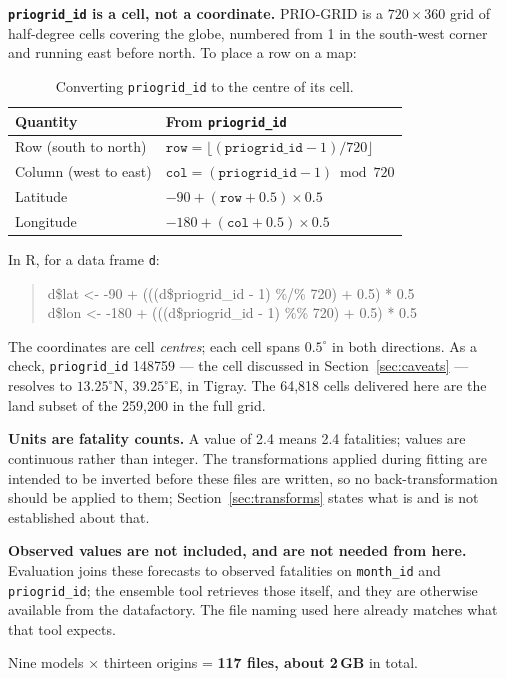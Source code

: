 \textbf{\texttt{priogrid\_id} is a cell, not a coordinate.} PRIO-GRID is a
$720 \times 360$ grid of half-degree cells covering the globe, numbered from 1 in the
south-west corner and running east before north. To place a row on a map:

\begin{table}[h!]
\centering
\renewcommand{\arraystretch}{1.3}
\caption{Converting \texttt{priogrid\_id} to the centre of its cell.}
\label{tab:priogrid}
\begin{tabular}{@{}p{4.6cm}p{9.4cm}@{}}
\toprule
\textbf{Quantity} & \textbf{From \texttt{priogrid\_id}} \\ \midrule
Row (south to north) & $\texttt{row} = \lfloor (\texttt{priogrid\_id} - 1) / 720 \rfloor$ \\
Column (west to east) & $\texttt{col} = (\texttt{priogrid\_id} - 1) \bmod 720$ \\
Latitude  & $-90 + (\texttt{row} + 0.5) \times 0.5$ \\
Longitude & $-180 + (\texttt{col} + 0.5) \times 0.5$ \\
\bottomrule
\end{tabular}
\end{table}

\noindent In R, for a data frame \texttt{d}:

\begin{quote}
\ttfamily\small
d\$lat <- -90  + (((d\$priogrid\_id - 1) \%/\% 720) + 0.5) * 0.5 \\
d\$lon <- -180 + (((d\$priogrid\_id - 1) \%\%  720) + 0.5) * 0.5
\end{quote}

\noindent The coordinates are cell \emph{centres}; each cell spans $0.5^\circ$ in both
directions. As a check, \texttt{priogrid\_id} 148759 --- the cell discussed in
Section~\ref{sec:caveats} --- resolves to $13.25^\circ$N, $39.25^\circ$E, in Tigray.
The 64,818 cells delivered here are the land subset of the 259,200 in the full grid.

\textbf{Units are fatality counts.} A value of 2.4 means 2.4 fatalities; values are continuous
rather than integer. The transformations applied during fitting are intended to be inverted
before these files are written, so no back-transformation should be applied to them;
Section~\ref{sec:transforms} states what is and is not established about that.

\textbf{Observed values are not included, and are not needed from here.} Evaluation joins these
forecasts to observed fatalities on \texttt{month\_id} and \texttt{priogrid\_id}; the
ensemble tool retrieves those itself, and they are otherwise available from the
datafactory. The file naming used here already matches what that tool expects.

Nine models $\times$ thirteen origins = \textbf{117 files, about 2\,GB} in total.
